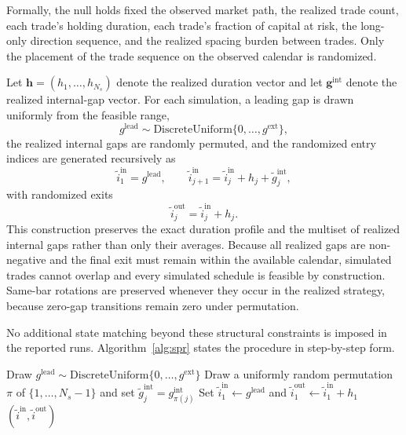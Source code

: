 \documentclass[preprint,12pt]{elsarticle}
\theoremstyle{definition}
\begin{document}
Formally, the null holds fixed the observed market path, the realized trade count, each trade's holding duration, each trade's fraction of capital at risk, the long-only direction sequence, and the realized spacing burden between trades. Only the placement of the trade sequence on the observed calendar is randomized.

Let \(\mathbf{h}=(h_1,\ldots,h_{N_s})\) denote the realized duration vector and let \(\mathbf{g}^{\mathrm{int}}\) denote the realized internal-gap vector. For each simulation, a leading gap is drawn uniformly from the feasible range,
\begin{equation}
g^{\mathrm{lead}} \sim \mathrm{DiscreteUniform}\{0,\ldots,g^{\mathrm{ext}}\},
\end{equation}
the realized internal gaps are randomly permuted, and the randomized entry indices are generated recursively as
\begin{equation}
\tilde{i}^{\mathrm{in}}_1=g^{\mathrm{lead}}, \qquad
\tilde{i}^{\mathrm{in}}_{j+1}=\tilde{i}^{\mathrm{in}}_j+h_j+\tilde{g}^{\mathrm{int}}_j,
\end{equation}
with randomized exits
\begin{equation}
\tilde{i}^{\mathrm{out}}_j=\tilde{i}^{\mathrm{in}}_j+h_j.
\end{equation}
This construction preserves the exact duration profile and the multiset of realized internal gaps rather than only their averages. Because all realized gaps are non-negative and the final exit must remain within the available calendar, simulated trades cannot overlap and every simulated schedule is feasible by construction. Same-bar rotations are preserved whenever they occur in the realized strategy, because zero-gap transitions remain zero under permutation.

No additional state matching beyond these structural constraints is imposed in the reported runs. Algorithm~\ref{alg:spr} states the procedure in step-by-step form.

\begin{algorithm}[H]
\caption{Structure-preserving randomization of a single trade schedule}
\label{alg:spr}
Draw $g^{\mathrm{lead}}\sim\mathrm{DiscreteUniform}\{0,\ldots,g^{\mathrm{ext}}\}$\;
Draw a uniformly random permutation $\pi$ of $\{1,\ldots,N_s-1\}$ and set $\tilde{g}^{\mathrm{int}}_j=g^{\mathrm{int}}_{\pi(j)}$\;
Set $\tilde{i}^{\mathrm{in}}_1\leftarrow g^{\mathrm{lead}}$ and $\tilde{i}^{\mathrm{out}}_1\leftarrow \tilde{i}^{\mathrm{in}}_1+h_1$\;
\Return $(\tilde{i}^{\mathrm{in}},\tilde{i}^{\mathrm{out}})$
\end{algorithm}
\end{document}
